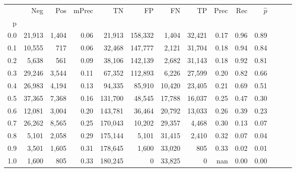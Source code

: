 \begin{tabular}{rrrrrrrrrrrrrr}
\toprule
{} &     Neg &    Pos & mPrec &       TN &       FP &      FN &      TP &  Prec &   Rec & $\hat{p}$ \\
p   &         &        &       &          &          &         &         &       &       &           \\
\midrule
0.0 &  21,913 &  1,404 &  0.06 &   21,913 &  158,332 &   1,404 &  32,421 &  0.17 &  0.96 &      0.89 \\
0.1 &  10,555 &    717 &  0.06 &   32,468 &  147,777 &   2,121 &  31,704 &  0.18 &  0.94 &      0.84 \\
0.2 &   5,638 &    561 &  0.09 &   38,106 &  142,139 &   2,682 &  31,143 &  0.18 &  0.92 &      0.81 \\
0.3 &  29,246 &  3,544 &  0.11 &   67,352 &  112,893 &   6,226 &  27,599 &  0.20 &  0.82 &      0.66 \\
0.4 &  26,983 &  4,194 &  0.13 &   94,335 &   85,910 &  10,420 &  23,405 &  0.21 &  0.69 &      0.51 \\
0.5 &  37,365 &  7,368 &  0.16 &  131,700 &   48,545 &  17,788 &  16,037 &  0.25 &  0.47 &      0.30 \\
0.6 &  12,081 &  3,004 &  0.20 &  143,781 &   36,464 &  20,792 &  13,033 &  0.26 &  0.39 &      0.23 \\
0.7 &  26,262 &  8,565 &  0.25 &  170,043 &   10,202 &  29,357 &   4,468 &  0.30 &  0.13 &      0.07 \\
0.8 &   5,101 &  2,058 &  0.29 &  175,144 &    5,101 &  31,415 &   2,410 &  0.32 &  0.07 &      0.04 \\
0.9 &   3,501 &  1,605 &  0.31 &  178,645 &    1,600 &  33,020 &     805 &  0.33 &  0.02 &      0.01 \\
1.0 &   1,600 &    805 &  0.33 &  180,245 &        0 &  33,825 &       0 &   nan &  0.00 &      0.00 \\
\bottomrule
\end{tabular}
